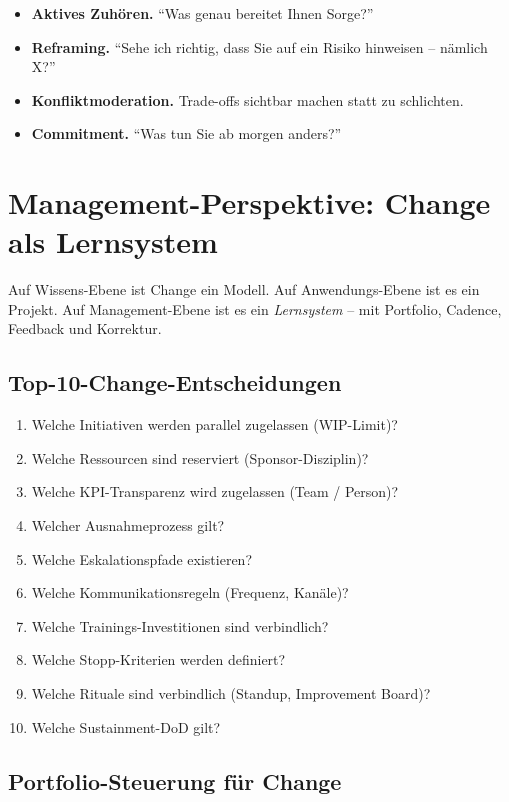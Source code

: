 \documentclass[11pt,a4paper,oneside]{article}
\begin{document}
\begin{itemize}
  \item \textbf{Aktives Zuhören.} ``Was genau bereitet Ihnen Sorge?''
  \item \textbf{Reframing.} ``Sehe ich richtig, dass Sie auf ein Risiko hinweisen -- nämlich X?''
  \item \textbf{Konfliktmoderation.} Trade-offs sichtbar machen statt zu schlichten.
  \item \textbf{Commitment.} ``Was tun Sie ab morgen anders?''
\end{itemize}

\section{Management-Perspektive: Change als Lernsystem}

Auf Wissens-Ebene ist Change ein Modell. Auf Anwendungs-Ebene ist es ein Projekt. Auf Management-Ebene ist es ein \emph{Lernsystem} -- mit Portfolio, Cadence, Feedback und Korrektur.

\subsection{Top-10-Change-Entscheidungen}

\begin{enumerate}
  \item Welche Initiativen werden parallel zugelassen (WIP-Limit)?
  \item Welche Ressourcen sind reserviert (Sponsor-Disziplin)?
  \item Welche KPI-Transparenz wird zugelassen (Team / Person)?
  \item Welcher Ausnahmeprozess gilt?
  \item Welche Eskalationspfade existieren?
  \item Welche Kommunikationsregeln (Frequenz, Kanäle)?
  \item Welche Trainings-Investitionen sind verbindlich?
  \item Welche Stopp-Kriterien werden definiert?
  \item Welche Rituale sind verbindlich (Standup, Improvement Board)?
  \item Welche Sustainment-DoD gilt?
\end{enumerate}

\subsection{Portfolio-Steuerung für Change}
\end{document}
